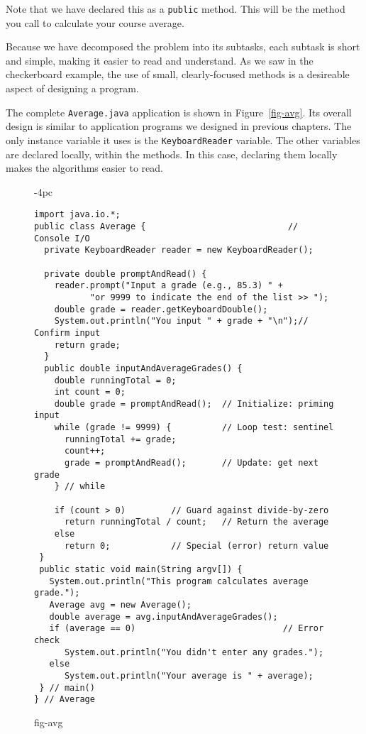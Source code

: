 \noindent Note that we have declared this as a {\tt public}
method. This will be the method you call to calculate your course
average. 

Because we have decomposed the problem into its subtasks, each subtask
is short and simple, making it easier to read and understand. As we saw
in the checkerboard example, the use of small, clearly-focused methods
is a desireable aspect of designing a program.

The complete {\tt Average.java} application is shown in
Figure~\ref{fig-avg}. Its overall design is similar to application
programs we designed in previous chapters. The only instance variable
it uses is the {\tt KeyboardReader} variable. The other variables are
declared locally, within the methods. In this case, declaring them
locally makes the algorithms easier to read.

\begin{figure}[h!]
\jjjprogstart
\begin{jjjlistingleft}[30pc]{-4pc}
\begin{lstlisting}
import java.io.*;
public class Average {                            // Console I/O
  private KeyboardReader reader = new KeyboardReader();  

  private double promptAndRead() {
    reader.prompt("Input a grade (e.g., 85.3) " +
           "or 9999 to indicate the end of the list >> ");
    double grade = reader.getKeyboardDouble();
    System.out.println("You input " + grade + "\n");// Confirm input
    return grade;
  }
  public double inputAndAverageGrades() {
    double runningTotal = 0;
    int count = 0;
    double grade = promptAndRead();  // Initialize: priming input
    while (grade != 9999) {          // Loop test: sentinel
      runningTotal += grade;                            
      count++;                                          
      grade = promptAndRead();       // Update: get next grade
    } // while

    if (count > 0)         // Guard against divide-by-zero
      return runningTotal / count;   // Return the average
    else
      return 0;            // Special (error) return value
 }
 public static void main(String argv[]) {
   System.out.println("This program calculates average grade."); 
   Average avg = new Average();
   double average = avg.inputAndAverageGrades();
   if (average == 0)                             // Error check
      System.out.println("You didn't enter any grades.");
   else
      System.out.println("Your average is " + average);        
 } // main()
} // Average
\end{lstlisting}
\end{jjjlistingleft}
{fig-avg}
\end{figure}

